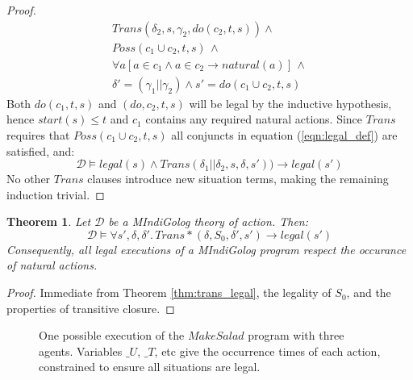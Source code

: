\documentclass[letterpaper]{article}
\newtheorem{theorem}{Theorem}
\begin{document}
\begin{proof}
\begin{multline*}
Trans(\delta_{2},s,\gamma_{2},do(c_{2},t,s))\wedge\\
Poss(c_{1}\cup c_{2},t,s)\,\wedge\\
\forall a\left[a\in c_{1}\wedge a\in c_{2}\rightarrow natural(a)\right]\,\wedge\\
\delta'=(\gamma_{1}||\gamma_{2})\wedge s'=do(c_{1}\cup c_{2},t,s)
\end{multline*}
Both $do(c_1,t,s)$ and $(do,c_2,t,s)$ will be legal by the inductive hypothesis,
hence $start(s) \leq t$ and $c_1$ contains any required natural actions.
Since $Trans$ requires that $Poss(c_1 \cup c_2,t,s)$ all conjuncts in
equation (\ref{eqn:legal_def}) are satisfied, and:
\begin{equation*}
\mathcal{D} \models legal(s) \wedge Trans(\delta_1 || \delta_2,s,\delta,s'))
\rightarrow legal(s')
\end{equation*}
No other $Trans$ clauses introduce new situation terms, making
the remaining induction trivial.
\end{proof}

\begin{theorem}
Let $\mathcal{D}$ be a MIndiGolog theory of action. Then:
\begin{equation*}
\mathcal{D} \models \forall s',\delta,\delta'.\,Trans*(\delta,S_0,\delta',s')
\rightarrow legal(s')
\end{equation*}
Consequently, all legal executions of a MIndiGolog program respect
the occurance of natural actions.
\end{theorem}

\begin{proof}
Immediate from Theorem \ref{thm:trans_legal}, the legality of $S_0$, and
the properties of transitive closure.
\end{proof}

\begin{figure*}[t]
\centering
{}
\caption{One possible execution of the $MakeSalad$
program with three agents. Variables $\_ U$, $\_ T$, etc give
the occurrence times of each action, constrained to ensure all situations
are legal.}\label{cap:example_trace}
\end{figure*}
\end{document}
